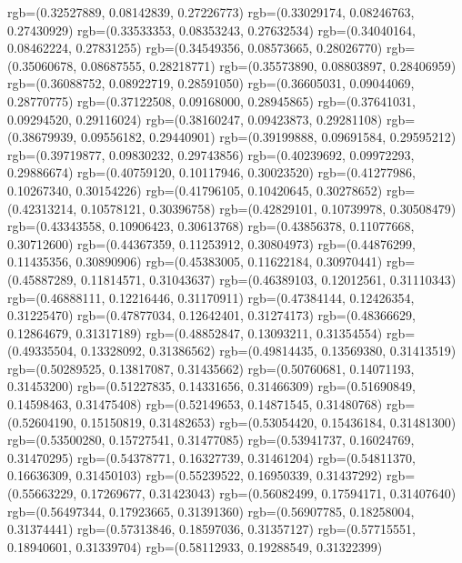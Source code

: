 {{        rgb=(0.32527889, 0.08142839, 0.27226773)
        rgb=(0.33029174, 0.08246763, 0.27430929)
        rgb=(0.33533353, 0.08353243, 0.27632534)
        rgb=(0.34040164, 0.08462224, 0.27831255)
        rgb=(0.34549356, 0.08573665, 0.28026770)
        rgb=(0.35060678, 0.08687555, 0.28218771)
        rgb=(0.35573890, 0.08803897, 0.28406959)
        rgb=(0.36088752, 0.08922719, 0.28591050)
        rgb=(0.36605031, 0.09044069, 0.28770775)
        rgb=(0.37122508, 0.09168000, 0.28945865)
        rgb=(0.37641031, 0.09294520, 0.29116024)
        rgb=(0.38160247, 0.09423873, 0.29281108)
        rgb=(0.38679939, 0.09556182, 0.29440901)
        rgb=(0.39199888, 0.09691584, 0.29595212)
        rgb=(0.39719877, 0.09830232, 0.29743856)
        rgb=(0.40239692, 0.09972293, 0.29886674)
        rgb=(0.40759120, 0.10117946, 0.30023520)
        rgb=(0.41277986, 0.10267340, 0.30154226)
        rgb=(0.41796105, 0.10420645, 0.30278652)
        rgb=(0.42313214, 0.10578121, 0.30396758)
        rgb=(0.42829101, 0.10739978, 0.30508479)
        rgb=(0.43343558, 0.10906423, 0.30613768)
        rgb=(0.43856378, 0.11077668, 0.30712600)
        rgb=(0.44367359, 0.11253912, 0.30804973)
        rgb=(0.44876299, 0.11435356, 0.30890906)
        rgb=(0.45383005, 0.11622184, 0.30970441)
        rgb=(0.45887289, 0.11814571, 0.31043637)
        rgb=(0.46389103, 0.12012561, 0.31110343)
        rgb=(0.46888111, 0.12216446, 0.31170911)
        rgb=(0.47384144, 0.12426354, 0.31225470)
        rgb=(0.47877034, 0.12642401, 0.31274173)
        rgb=(0.48366629, 0.12864679, 0.31317189)
        rgb=(0.48852847, 0.13093211, 0.31354554)
        rgb=(0.49335504, 0.13328092, 0.31386562)
        rgb=(0.49814435, 0.13569380, 0.31413519)
        rgb=(0.50289525, 0.13817087, 0.31435662)
        rgb=(0.50760681, 0.14071193, 0.31453200)
        rgb=(0.51227835, 0.14331656, 0.31466309)
        rgb=(0.51690849, 0.14598463, 0.31475408)
        rgb=(0.52149653, 0.14871545, 0.31480768)
        rgb=(0.52604190, 0.15150819, 0.31482653)
        rgb=(0.53054420, 0.15436184, 0.31481300)
        rgb=(0.53500280, 0.15727541, 0.31477085)
        rgb=(0.53941737, 0.16024769, 0.31470295)
        rgb=(0.54378771, 0.16327739, 0.31461204)
        rgb=(0.54811370, 0.16636309, 0.31450103)
        rgb=(0.55239522, 0.16950339, 0.31437292)
        rgb=(0.55663229, 0.17269677, 0.31423043)
        rgb=(0.56082499, 0.17594171, 0.31407640)
        rgb=(0.56497344, 0.17923665, 0.31391360)
        rgb=(0.56907785, 0.18258004, 0.31374441)
        rgb=(0.57313846, 0.18597036, 0.31357127)
        rgb=(0.57715551, 0.18940601, 0.31339704)
        rgb=(0.58112933, 0.19288549, 0.31322399)
}}
